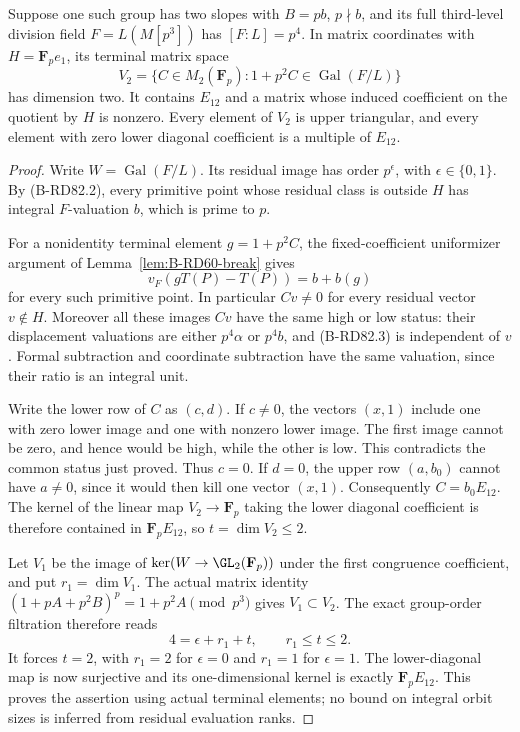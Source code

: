\begin{lemma}
\label{lem:B-RD82-terminal}
Suppose one such group has two slopes with \(B=pb\),
\(p\nmid b\), and its full third-level division field
\(F=L(M[p^3])\) has \([F:L]=p^4\). In matrix coordinates
with \(H=\mathbf F_p e_1\), its terminal matrix space
\[
 V_2=\{C\in M_2(\mathbf F_p):1+p^2C\in
                \operatorname{Gal}(F/L)\}
\]
has dimension two. It contains \(E_{12}\) and a matrix
whose induced coefficient on the quotient by \(H\) is
nonzero. Every element of \(V_2\) is upper triangular,
and every element with zero lower diagonal coefficient
is a multiple of \(E_{12}\).
\end{lemma}
\begin{proof}
Write \(W=\operatorname{Gal}(F/L)\). Its residual image
has order \(p^\epsilon\), with \(\epsilon\in\{0,1\}\).
By (B-RD82.2), every primitive point whose residual class
is outside \(H\) has integral \(F\)-valuation \(b\),
which is prime to \(p\).

For a nonidentity terminal element \(g=1+p^2C\), the
fixed-coefficient uniformizer argument of
Lemma~\ref{lem:B-RD60-break} gives
\[
             v_F(gT(P)-T(P))=b+b(g)                 \tag{B-RD82.3}
\]
for every such primitive point. In particular \(Cv\ne0\)
for every residual vector \(v\notin H\). Moreover all
these images \(Cv\) have the same high or low status:
their displacement valuations are either \(p^4\alpha\)
or \(p^4b\), and (B-RD82.3) is independent of \(v\).
Formal subtraction and coordinate subtraction have the
same valuation, since their ratio is an integral unit.

Write the lower row of \(C\) as \((c,d)\). If \(c\ne0\),
the vectors \((x,1)\) include one with zero lower image
and one with nonzero lower image. The first image cannot
be zero, and hence would be high, while the other is low.
This contradicts the common status just proved. Thus
\(c=0\). If \(d=0\), the upper row \((a,b_0)\) cannot
have \(a\ne0\), since it would then kill one vector
\((x,1)\). Consequently \(C=b_0E_{12}\).
The kernel of the linear map \(V_2\to\mathbf F_p\)
taking the lower diagonal coefficient is therefore
contained in \(\mathbf F_pE_{12}\), so \(t=\dim V_2\le2\).

Let \(V_1\) be the image of
\(\ker(W\to\GL_2(\mathbf F_p))\) under the first
congruence coefficient, and put \(r_1=\dim V_1\).
The actual matrix identity
\((1+pA+p^2B)^p=1+p^2A\pmod{p^3}\) gives
\(V_1\subset V_2\). The exact group-order filtration
therefore reads
\[
             4=\epsilon+r_1+t,
                    \qquad r_1\le t\le2.             \tag{B-RD82.4}
\]
It forces \(t=2\), with \(r_1=2\) for \(\epsilon=0\)
and \(r_1=1\) for \(\epsilon=1\). The lower-diagonal
map is now surjective and its one-dimensional kernel
is exactly \(\mathbf F_pE_{12}\). This proves the
assertion using actual terminal elements; no bound on
integral orbit sizes is inferred from residual evaluation ranks.
\end{proof}

